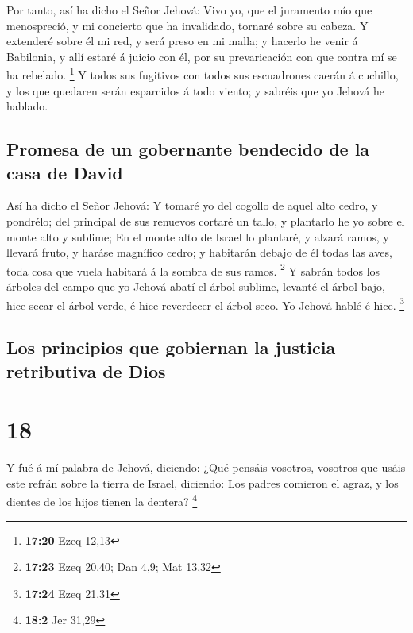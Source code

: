  Por tanto, así ha dicho el Señor Jehová: Vivo yo, que el
juramento mío que menospreció, y mi concierto que ha invalidado, tornaré
sobre su cabeza.  Y extenderé sobre él mi red, y será preso
en mi malla; y hacerlo he venir á Babilonia, y allí estaré á juicio con
él, por su prevaricación con que contra mí se ha rebelado. \footnote{\textbf{17:20}
  Ezeq 12,13}  Y todos sus fugitivos con todos sus
escuadrones caerán á cuchillo, y los que quedaren serán esparcidos á
todo viento; y sabréis que yo Jehová he hablado.

\hypertarget{promesa-de-un-gobernante-bendecido-de-la-casa-de-david}{%
\subsection{Promesa de un gobernante bendecido de la casa de
David}\label{promesa-de-un-gobernante-bendecido-de-la-casa-de-david}}

 Así ha dicho el Señor Jehová: Y tomaré yo del cogollo de
aquel alto cedro, y pondrélo; del principal de sus renuevos cortaré un
tallo, y plantarlo he yo sobre el monte alto y sublime;  En
el monte alto de Israel lo plantaré, y alzará ramos, y llevará fruto, y
haráse magnífico cedro; y habitarán debajo de él todas las aves, toda
cosa que vuela habitará á la sombra de sus ramos. \footnote{\textbf{17:23}
  Ezeq 20,40; Dan 4,9; Mat 13,32}  Y sabrán todos los
árboles del campo que yo Jehová abatí el árbol sublime, levanté el árbol
bajo, hice secar el árbol verde, é hice reverdecer el árbol seco. Yo
Jehová hablé é hice. \footnote{\textbf{17:24} Ezeq 21,31}

\hypertarget{los-principios-que-gobiernan-la-justicia-retributiva-de-dios}{%
\subsection{Los principios que gobiernan la justicia retributiva de
Dios}\label{los-principios-que-gobiernan-la-justicia-retributiva-de-dios}}

\hypertarget{section-17}{%
\section{18}\label{section-17}}

 Y fué á mí palabra de Jehová, diciendo:  ¿Qué
pensáis vosotros, vosotros que usáis este refrán sobre la tierra de
Israel, diciendo: Los padres comieron el agraz, y los dientes de los
hijos tienen la dentera? \footnote{\textbf{18:2} Jer 31,29}

